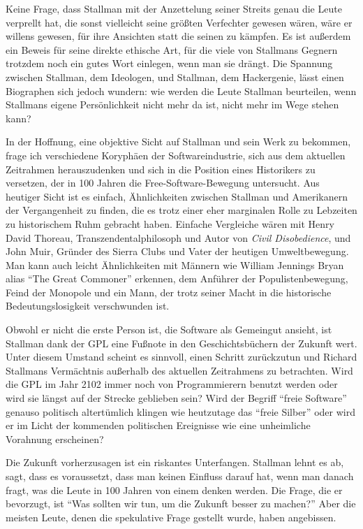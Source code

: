 Keine Frage, dass Stallman mit der Anzettelung seiner Streits genau die Leute verprellt hat, die sonst vielleicht seine größten Verfechter gewesen wären, wäre er willens gewesen, für ihre Ansichten statt die seinen zu kämpfen. Es ist außerdem ein Beweis für seine direkte ethische Art, für die viele von Stallmans Gegnern trotzdem noch ein gutes Wort einlegen, wenn man sie drängt. Die Spannung zwischen Stallman, dem Ideologen, und Stallman, dem Hackergenie, lässt einen Biographen sich jedoch wundern: wie werden die Leute Stallman beurteilen, wenn Stallmans eigene Persönlichkeit nicht mehr da ist, nicht mehr im Wege stehen kann?

 In der Hoffnung, eine objektive Sicht auf Stallman und sein Werk zu bekommen, frage ich verschiedene Koryphäen der Softwareindustrie, sich aus dem aktuellen Zeitrahmen herauszudenken und sich in die Position eines Historikers zu versetzen, der in 100 Jahren die Free-Software-Bewegung untersucht. Aus heutiger Sicht ist es einfach, Ähnlichkeiten zwischen Stallman und Amerikanern der Vergangenheit zu finden, die es trotz einer eher marginalen Rolle zu Lebzeiten zu historischem Ruhm gebracht haben. Einfache Vergleiche wären mit Henry David Thoreau, Transzendentalphilosoph und Autor von \textit{Civil Disobedience}, und John Muir, Gründer des Sierra Clubs und Vater der heutigen Umweltbewegung. Man kann auch leicht Ähnlichkeiten mit Männern wie William Jennings Bryan alias "`The Great Commoner"' erkennen, dem Anführer der Populistenbewegung, Feind der Monopole und ein Mann, der trotz seiner Macht in die historische Bedeutungslosigkeit verschwunden ist.

Obwohl er nicht die erste Person ist, die Software als Gemeingut ansieht, ist Stallman dank der GPL eine Fußnote in den Geschichtsbüchern der Zukunft wert. Unter diesem Umstand scheint es sinnvoll, einen Schritt zurückzutun und Richard Stallmans Vermächtnis außerhalb des aktuellen Zeitrahmens zu betrachten. Wird die GPL im Jahr 2102 immer noch von Programmierern benutzt werden oder wird sie längst auf der Strecke geblieben sein? Wird der Begriff "`freie Software"' genauso politisch altertümlich klingen wie heutzutage das "`freie Silber"' oder wird er im Licht der kommenden politischen Ereignisse wie eine unheimliche Vorahnung erscheinen?

Die Zukunft vorherzusagen ist ein riskantes Unterfangen. Stallman lehnt es ab, sagt, dass es voraussetzt, dass man keinen Einfluss darauf hat, wenn man danach fragt, was die Leute in 100 Jahren von einem denken werden. Die Frage, die er bevorzugt, ist "`Was sollten wir tun, um die Zukunft besser zu machen?"' Aber die meisten Leute, denen die spekulative Frage gestellt wurde, haben angebissen.
 
